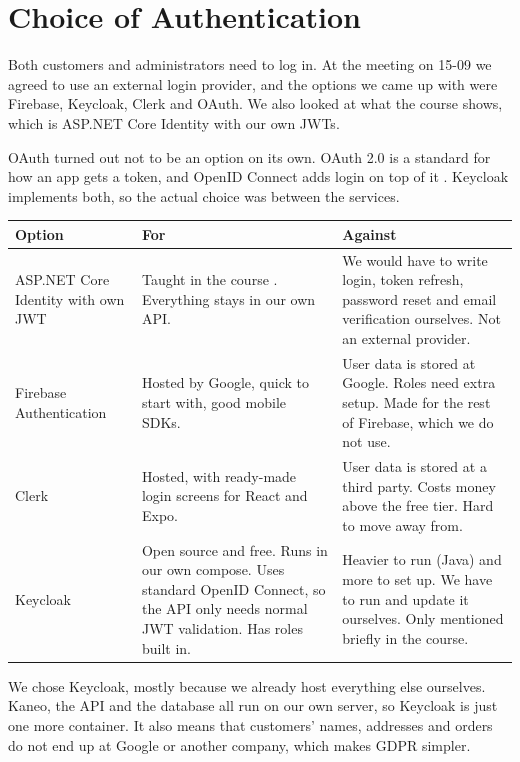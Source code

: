 \documentclass[a4paper,11pt]{article}
\begin{document}
\section{Choice of Authentication}
\label{sec:auth}
Both customers and administrators need to log in. At the meeting on 15-09 we agreed to use an external login provider, and the options we came up with were Firebase, Keycloak, Clerk and OAuth. We also looked at what the course shows, which is ASP.NET Core Identity with our own JWTs.

OAuth turned out not to be an option on its own. OAuth 2.0 is a standard for how an app gets a token, and OpenID Connect adds login on top of it \cite[sec.~8.1.2]{goldman-maui-in-action}. Keycloak implements both, so the actual choice was between the services.

\begin{center}
\begin{tabular}{@{}p{3.1cm} p{5.6cm} p{5.6cm}@{}}
\textbf{Option} & \textbf{For} & \textbf{Against} \\
\hline
ASP.NET Core Identity with own JWT & Taught in the course \cite[sec.~9.2]{desanctis-web-apis-aspnet-core}. Everything stays in our own API. & We would have to write login, token refresh, password reset and email verification ourselves. Not an external provider. \\
\hline
Firebase Authentication & Hosted by Google, quick to start with, good mobile SDKs. & User data is stored at Google. Roles need extra setup. Made for the rest of Firebase, which we do not use. \\
\hline
Clerk & Hosted, with ready-made login screens for React and Expo. & User data is stored at a third party. Costs money above the free tier. Hard to move away from. \\
\hline
Keycloak & Open source and free. Runs in our own compose. Uses standard OpenID Connect, so the API only needs normal JWT validation. Has roles built in. & Heavier to run (Java) and more to set up. We have to run and update it ourselves. Only mentioned briefly in the course. \\
\hline
\end{tabular}
\end{center}

We chose Keycloak, mostly because we already host everything else ourselves. Kaneo, the API and the database all run on our own server, so Keycloak is just one more container. It also means that customers' names, addresses and orders do not end up at Google or another company, which makes GDPR simpler.
\end{document}
